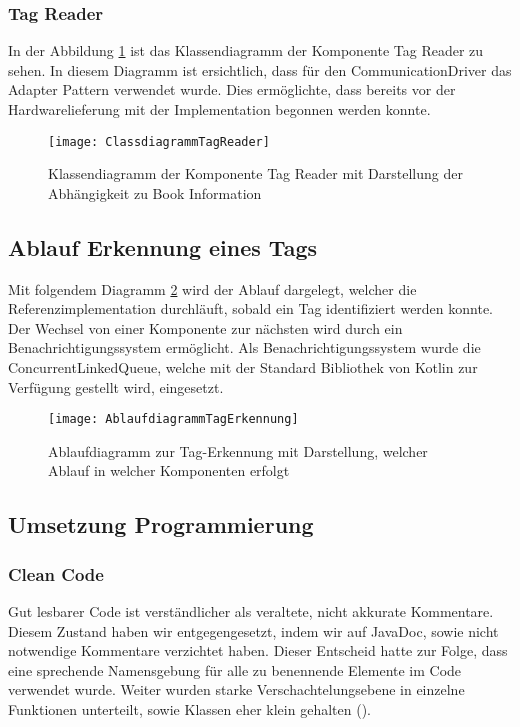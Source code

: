 \subsubsection{Tag Reader}
In der Abbildung \ref{fig:ClassTagReader} ist das Klassendiagramm der Komponente Tag Reader zu sehen.
In diesem Diagramm ist ersichtlich, dass für den CommunicationDriver das Adapter Pattern verwendet wurde. Dies ermöglichte, dass bereits vor der Hardwarelieferung mit der Implementation begonnen werden konnte. 

\begin{figure}[htb]
	\centering
	\texttt{[image: ClassdiagrammTagReader]}
	\caption{Klassendiagramm der Komponente Tag Reader mit Darstellung der Abhängigkeit zu Book Information}
	\label{fig:ClassTagReader}
\end{figure}


\subsection{Ablauf Erkennung eines Tags}
Mit folgendem Diagramm \ref{fig:AblaufdiagrammTagErkennung} wird der Ablauf dargelegt, welcher die Referenzimplementation durchläuft, sobald ein Tag identifiziert werden konnte. Der Wechsel von einer Komponente zur nächsten wird durch ein Benachrichtigungssystem ermöglicht. Als Benachrichtigungssystem wurde die ConcurrentLinkedQueue, welche mit der Standard Bibliothek von Kotlin zur Verfügung gestellt wird, eingesetzt. 
\begin{figure}[htb]
	\centering
	\texttt{[image: AblaufdiagrammTagErkennung]}
	\caption{Ablaufdiagramm zur Tag-Erkennung mit Darstellung, welcher Ablauf in welcher Komponenten erfolgt}
	\label{fig:AblaufdiagrammTagErkennung}
\end{figure}

\clearpage
\subsection{Umsetzung Programmierung}
\subsubsection{Clean Code}
Gut lesbarer Code ist verständlicher als veraltete, nicht akkurate Kommentare. Diesem Zustand haben wir entgegengesetzt, indem wir auf JavaDoc, sowie nicht notwendige Kommentare verzichtet haben. Dieser Entscheid hatte zur Folge, dass eine sprechende Namensgebung für alle zu benennende Elemente im Code verwendet wurde. Weiter wurden starke Verschachtelungsebene in einzelne Funktionen unterteilt, sowie Klassen eher klein gehalten (\cite{martin2009clean}).

